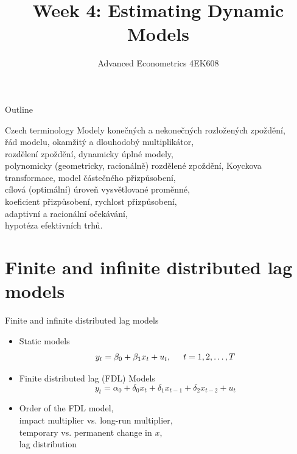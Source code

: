 \documentclass{beamer}
\title[Week1]{Week 4:  Estimating Dynamic Models}
\author{Advanced Econometrics 4EK608}
\institute{Vysoká škola ekonomická v Praze}
\date{}
\begin{document}
 
\begin{frame}
  \titlepage
\end{frame}

\begin{frame}{Outline}
  \tableofcontents
\end{frame}


\begin{frame}{Czech terminology}
Modely konečných a nekonečných
rozložených zpoždění, 
\\řád modelu, okamžitý
a dlouhodobý multiplikátor, 
\\ rozdělení zpoždění, dynamicky úplné modely,
\\ polynomicky (geometricky, racionálně)
rozdělené zpoždění, Koyckova transformace,
model částečného přizpůsobení,
\\ cílová (optimální) úroveň vysvětlované proměnné,
\\ koeficient přizpůsobení, rychlost
přizpůsobení, 
\\ adaptivní a racionální očekávání, 
\\ hypotéza efektivních trhů.
\end{frame}


\section{Finite and infinite distributed lag models}
\begin{frame}{Finite and infinite distributed lag models}
\begin{itemize}
\item Static models
$$y_t = \beta_0 + \beta_1 x_t + u_t, \hspace{0.5cm} t=1, 2, \dots, T$$
\item Finite distributed lag (FDL) Models 
$$ y_t = \alpha_0 + \delta_0 x_t + \delta_1 x_{t-1} + \delta_2 x_{t-2} + u_t$$
\item Order of the FDL model, \\impact multiplier vs. long-run multiplier, \\temporary vs. permanent change in $x$, 
\\lag distribution
\end{itemize}
\end{frame}
\end{document}
